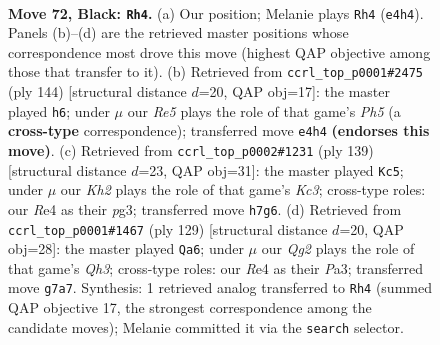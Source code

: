 \documentclass[11pt]{article}
\begin{document}
\clearpage

\begin{figure}[p]\centering
\begin{subfigure}{0.46\textwidth}\centering
\resizebox{\linewidth}{!}{%
\newchessgame
\chessboard[
  setfen={8/6qk/5p2/3Q4/4r3/6P1/6KP/8 b - - 0 72},
  showmover=false,
  pgfstyle=straightmove, color=movearrow, markmove={e4-h4}
]}
\caption{}
\end{subfigure}\hfill
\begin{subfigure}{0.46\textwidth}\centering
\resizebox{\linewidth}{!}{%
\newchessgame
\chessboard[
  setfen={8/1P2Q1pk/8/1q1p3P/8/4K3/8/8 w - - 2 73},
  showmover=false,
  pgfstyle=straightmove, color=movearrow, markmove={h5-h6}
]}
\caption{}
\end{subfigure}
\\[4pt]
\begin{subfigure}{0.46\textwidth}\centering
\resizebox{\linewidth}{!}{%
\newchessgame
\chessboard[
  setfen={8/8/1qk4p/6p1/p7/3Q2P1/5P2/6K1 b - - 3 70},
  showmover=false,
  pgfstyle=straightmove, color=movearrow, markmove={c6-c5}
]}
\caption{}
\end{subfigure}\hfill
\begin{subfigure}{0.46\textwidth}\centering
\resizebox{\linewidth}{!}{%
\newchessgame
\chessboard[
  setfen={8/7k/7q/3Q4/5p2/p4P1P/6PK/8 b - - 0 65},
  showmover=false,
  pgfstyle=straightmove, color=movearrow, markmove={h6-a6}
]}
\caption{}
\end{subfigure}
\caption{\textbf{Move 72, Black: \texttt{Rh4}.} (a) Our position; Melanie plays \texttt{Rh4} (\texttt{e4h4}). Panels (b)--(d) are the retrieved master positions whose correspondence most drove this move (highest QAP objective among those that transfer to it). (b) Retrieved from \texttt{ccrl\_top\_p0001\#2475} (ply 144) [structural distance $d$=20, QAP obj=17]: the master played \texttt{h6}; under $\mu$ our \emph{Re5} plays the role of that game's \emph{Ph5} (a \textbf{cross-type} correspondence); transferred move \texttt{e4h4} \textbf{(endorses this move)}. (c) Retrieved from \texttt{ccrl\_top\_p0002\#1231} (ply 139) [structural distance $d$=23, QAP obj=31]: the master played \texttt{Kc5}; under $\mu$ our \emph{Kh2} plays the role of that game's \emph{Kc3}; cross-type roles: our \emph{R}e4 as their \emph{p}g3; transferred move \texttt{h7g6}. (d) Retrieved from \texttt{ccrl\_top\_p0001\#1467} (ply 129) [structural distance $d$=20, QAP obj=28]: the master played \texttt{Qa6}; under $\mu$ our \emph{Qg2} plays the role of that game's \emph{Qh3}; cross-type roles: our \emph{R}e4 as their \emph{P}a3; transferred move \texttt{g7a7}. Synthesis: 1 retrieved analog transferred to \texttt{Rh4} (summed QAP objective 17, the strongest correspondence among the candidate moves); Melanie committed it via the \texttt{search} selector.}
\label{fig:thought-m143}
\end{figure}
\end{document}
